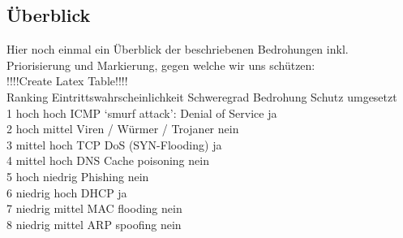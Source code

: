 \documentclass[11pt,a4paper,parskip=half]{scrartcl}
\begin{document}
\subsection{Überblick}
Hier noch einmal ein Überblick der beschriebenen Bedrohungen inkl. Priorisierung und Markierung, gegen welche wir uns schützen:\\
!!!!Create Latex Table!!!!\\
Ranking	Eintrittswahrscheinlichkeit		Schweregrad		Bedrohung					Schutz umgesetzt\\
1		hoch					hoch			ICMP ‘smurf attack’: Denial of Service	ja\\
2		hoch					mittel			Viren / Würmer / Trojaner			nein\\
3		mittel					hoch			TCP DoS (SYN-Flooding)			ja\\
4		mittel					hoch			DNS Cache poisoning			nein\\
5		hoch					niedrig		Phishing					nein\\
6		niedrig				hoch			DHCP						ja\\
7		niedrig				mittel			MAC flooding					nein\\
8		niedrig				mittel			ARP spoofing				nein\\
\end{document}
